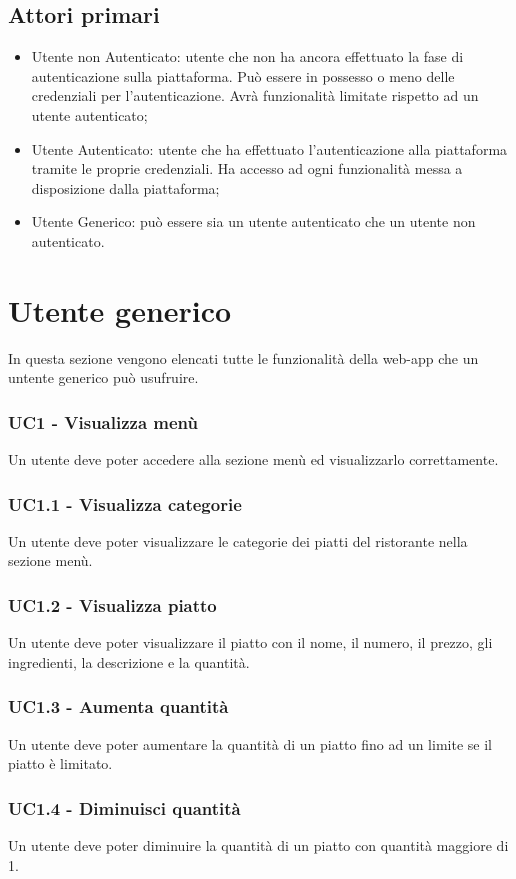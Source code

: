 \subsection{Attori primari}
\begin{itemize}
    \item Utente non Autenticato: utente che non ha ancora effettuato la fase di autenticazione sulla piattaforma. Può essere in possesso o meno delle credenziali per l'autenticazione. Avrà funzionalità limitate rispetto ad un utente autenticato;
    \item Utente Autenticato: utente che ha effettuato l'autenticazione alla piattaforma tramite le proprie credenziali. Ha accesso ad ogni funzionalità messa a disposizione dalla piattaforma;
    \item  Utente Generico: può essere sia un utente autenticato che un utente non autenticato.
\end{itemize}
\section{Utente generico}
In questa sezione vengono elencati tutte le funzionalità della web-app che un untente generico può usufruire.
\subsubsection{UC1 - Visualizza menù}
Un utente deve poter accedere alla sezione menù ed visualizzarlo correttamente.
\subsubsection{UC1.1 - Visualizza categorie}
Un utente deve poter visualizzare le categorie dei piatti del ristorante nella sezione menù.
\subsubsection{UC1.2 - Visualizza piatto}
Un utente deve poter visualizzare il piatto con il nome, il numero, il prezzo, gli ingredienti, la descrizione e la quantità.
\subsubsection{UC1.3 - Aumenta quantità}
Un utente deve poter aumentare la quantità di un piatto fino ad un limite se il piatto è limitato.
\subsubsection{UC1.4 - Diminuisci quantità}
Un utente deve poter diminuire la quantità di un piatto con quantità maggiore di 1.
